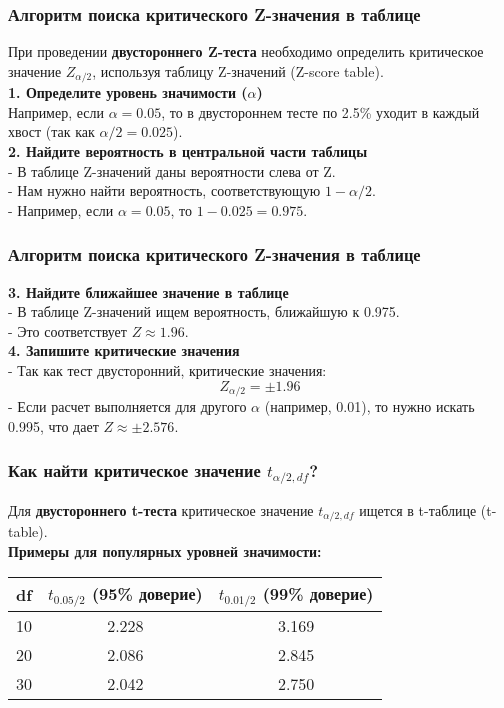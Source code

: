 \documentclass[aspectratio=169]{beamer}
\begin{document}
\begin{frame}
\frametitle{Алгоритм поиска критического Z-значения в таблице}
При проведении {\bf двустороннего Z-теста} необходимо определить критическое значение \( Z_{\alpha/2} \), используя таблицу Z-значений (Z-score table).
\newline\\
{\bf 1. Определите уровень значимости (\(\alpha\))}\\
Например, если \(\alpha = 0.05\), то в двустороннем тесте по 2.5\% уходит в каждый хвост (так как \( \alpha/2 = 0.025 \)).  
\newline\\
{\bf 2. Найдите вероятность в центральной части таблицы}\\
- В таблице Z-значений даны вероятности слева от Z. \\
- Нам нужно найти вероятность, соответствующую \( 1 - \alpha/2 \). \\
- Например, если \(\alpha = 0.05\), то \( 1 - 0.025 = 0.975 \). 
\end{frame}

\begin{frame}
\frametitle{Алгоритм поиска критического Z-значения в таблице}
{\bf 3. Найдите ближайшее значение в таблице}\\
- В таблице Z-значений ищем вероятность, ближайшую к 0.975. \\
- Это соответствует \(Z \approx 1.96\). 
\newline\\
{\bf 4. Запишите критические значения}\\
- Так как тест двусторонний, критические значения:  
\[
Z_{\alpha/2} = \pm 1.96
\]
- Если расчет выполняется для другого \(\alpha\) (например, 0.01), то нужно искать 0.995, что дает \( Z \approx \pm 2.576 \).  
\end{frame}

\begin{frame}
\frametitle{Как найти критическое значение \(t_{\alpha/2, df}\)?}
Для {\bf двустороннего t-теста} критическое значение \( t_{\alpha/2, df} \) ищется в t-таблице (t-table).
\newline\\
{\bf Примеры для популярных уровней значимости:}\\
\begin{center}
\begin{tabular}{ |c|c|c| } 
 \hline
 df & \( t_{0.05/2} \) (95\% доверие) & \( t_{0.01/2} \) (99\% доверие)\\ 
 \hline
 10 & 2.228 & 3.169\\
 \hline
 20 & 2.086 & 2.845\\
 \hline
 30 & 2.042 & 2.750\\
 \hline
\end{tabular}
\end{center}
\end{frame}
\end{document}

